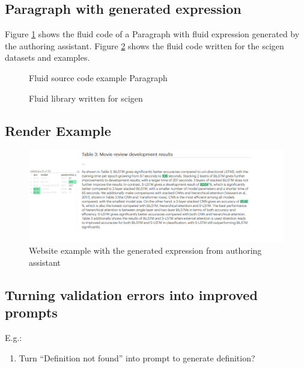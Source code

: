 \subsection{Paragraph with generated expression}
Figure \ref{fig:fluid-example-paragraph} shows the fluid code of a Paragraph with fluid expression generated by the authoring assistant.
Figure \ref{fig:fluid-scigen} shows the fluid code written for the scigen datasets and examples.
\begin{figure}[h]
    \small
    {}
    \vspace{-0.5em}
    \caption{Fluid source code example Paragraph}
    \label{fig:fluid-example-paragraph}
\end{figure}

\begin{figure}[h]
    \small
    {}
    \vspace{-0.5em}
    \caption{Fluid library written for scigen}
    \label{fig:fluid-scigen}
\end{figure}


\subsection{Render Example}

\begin{figure}
    \centering
    \includegraphics[width=0.95\linewidth]{fig/scigen-mr-1906.02780-10.png}
    \caption{Website example with the generated expression from authoring assistant}\label{fig:scigen-example-website}
\end{figure}


\subsection{Turning validation errors into improved prompts}\label{subsec:turning-validation-errors-into-improved-prompts}
E.g.:
\begin{enumerate}
\item Turn ``Definition not found'' into prompt to generate definition?
\end{enumerate}

